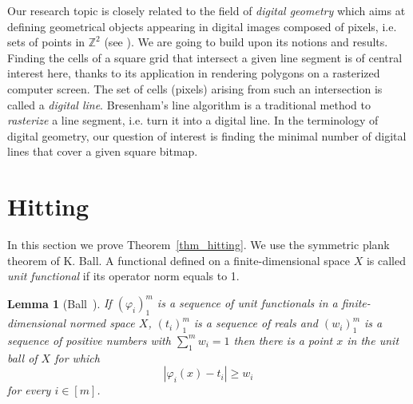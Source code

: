 \documentclass[11pt,a4paper]{amsart}
\newtheorem{lemma}[theorem]{Lemma}
\begin{document}
Our research topic is closely related to the field of {\em digital geometry} which aims at defining geometrical objects appearing in digital images composed of pixels, i.e. sets of points in $\mathbb{Z}^2$ (see \cite{R91, KR04}). We are going to build upon its notions and results. Finding the cells of a square grid that intersect a given line segment is of central interest here, thanks to its application in rendering polygons on a rasterized computer screen. The set of cells (pixels) arising from such an intersection is called a \textit{digital line}. Bresenham’s line algorithm \cite{B65} is a traditional method to \textit{rasterize} a line segment, i.e. turn it into a digital line. In the terminology of digital geometry, our question of interest is finding the minimal number of digital lines that cover a given square bitmap. 

\section{Hitting}
In this section we prove Theorem~\ref{thm_hitting}. We use the symmetric plank theorem of K. Ball. A functional defined on a finite-dimensional space $X$ is called {\em unit functional} if its operator norm equals to 1. 

\begin{lemma}[Ball~\cite{B91}]\label{lemma_planksymm}
If $(\varphi_i)_1^m$ is a sequence of unit functionals in a finite-dimensional normed space $X$, $(t_i)_1^m$ is a sequence of reals and $(w_i)_1^m$ is a sequence of positive numbers with $\sum_1^m w_i = 1$ then there is a point $x$ in the unit ball of $X$ for which
\[
|\varphi_i(x) - t_i|\geq w_i
\]
for every $i \in [m]$.
\end{lemma}
\end{document}
